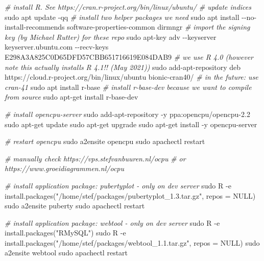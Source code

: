 \documentclass[
]{book}
\newenvironment{Shaded}{\begin{snugshade}}{\end{snugshade}}
\newcommand{\AttributeTok}[1]{\textcolor[rgb]{0.77,0.63,0.00}{#1}}
\newcommand{\CommentTok}[1]{\textcolor[rgb]{0.56,0.35,0.01}{\textit{#1}}}
\newcommand{\FunctionTok}[1]{\textcolor[rgb]{0.00,0.00,0.00}{#1}}
\newcommand{\NormalTok}[1]{#1}
\newcommand{\StringTok}[1]{\textcolor[rgb]{0.31,0.60,0.02}{#1}}
\begin{document}
\begin{Shaded}
\begin{Highlighting}[]
\CommentTok{\# install R. See https://cran.r{-}project.org/bin/linux/ubuntu/}
\CommentTok{\# update indices}
\FunctionTok{sudo}\NormalTok{ apt update }\AttributeTok{{-}qq}
\CommentTok{\# install two helper packages we need}
\FunctionTok{sudo}\NormalTok{ apt install }\AttributeTok{{-}{-}no{-}install{-}recommends}\NormalTok{ software{-}properties{-}common dirmngr}
\CommentTok{\# import the signing key (by Michael Rutter) for these repo}
\FunctionTok{sudo}\NormalTok{ apt{-}key adv }\AttributeTok{{-}{-}keyserver}\NormalTok{ keyserver.ubuntu.com }\AttributeTok{{-}{-}recv{-}keys}\NormalTok{ E298A3A825C0D65DFD57CBB651716619E084DAB9}
\CommentTok{\# we use R 4.0 (however note this actually installs R 4.1!! (May 2021))}
\FunctionTok{sudo}\NormalTok{ add{-}apt{-}repository }\StringTok{\textquotesingle{}deb https://cloud.r{-}project.org/bin/linux/ubuntu bionic{-}cran40/\textquotesingle{}}
\CommentTok{\# in the future: use cran{-}41}
\FunctionTok{sudo}\NormalTok{ apt install r{-}base}
\CommentTok{\# install r{-}base{-}dev because we want to compile from source}
\FunctionTok{sudo}\NormalTok{ apt{-}get install r{-}base{-}dev}

\CommentTok{\# install opencpu{-}server}
\FunctionTok{sudo}\NormalTok{ add{-}apt{-}repository }\AttributeTok{{-}y}\NormalTok{ ppa:opencpu/opencpu{-}2.2}
\FunctionTok{sudo}\NormalTok{ apt{-}get update}
\FunctionTok{sudo}\NormalTok{ apt{-}get upgrade}
\FunctionTok{sudo}\NormalTok{ apt{-}get install }\AttributeTok{{-}y}\NormalTok{ opencpu{-}server}

\CommentTok{\# restart opencpu}
\FunctionTok{sudo}\NormalTok{ a2ensite opencpu}
\FunctionTok{sudo}\NormalTok{ apachectl restart}

\CommentTok{\# manually check https://vps.stefvanbuuren.nl/ocpu }
\CommentTok{\# or https://www.groeidiagrammen.nl/ocpu}

\CommentTok{\# install application package: pubertyplot {-} only on dev server}
\FunctionTok{sudo}\NormalTok{ R }\AttributeTok{{-}e} \StringTok{\textquotesingle{}install.packages("/home/stef/packages/pubertyplot\_1.3.tar.gz", repos = NULL)\textquotesingle{}}
\FunctionTok{sudo}\NormalTok{ a2ensite puberty}
\FunctionTok{sudo}\NormalTok{ apachectl restart}

\CommentTok{\# install application package: webtool {-} only on dev server}
\FunctionTok{sudo}\NormalTok{ R }\AttributeTok{{-}e} \StringTok{\textquotesingle{}install.packages("RMySQL")\textquotesingle{}}
\FunctionTok{sudo}\NormalTok{ R }\AttributeTok{{-}e} \StringTok{\textquotesingle{}install.packages("/home/stef/packages/webtool\_1.1.tar.gz", repos = NULL)\textquotesingle{}}
\FunctionTok{sudo}\NormalTok{ a2ensite webtool}
\FunctionTok{sudo}\NormalTok{ apachectl restart}


\end{Highlighting}
\end{Shaded}
\end{document}
